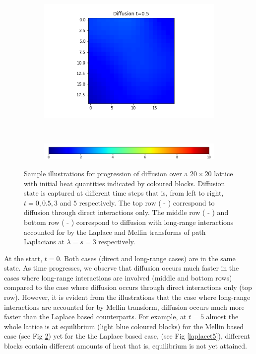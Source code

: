 \documentclass[10pt,a4paper]{article}
\theoremstyle{plain}
\theoremstyle{definition}
\begin{document}
\begin{figure}[!h]
\begin{subfigure}[b]{0.25\textwidth}
    		\caption{}
    		\label{mellint3}
    	\end{subfigure}~
    	\begin{subfigure}[b]{0.25\textwidth}
    		\includegraphics[width= \textwidth]{images/mellin-x3-t5.png}
    		\caption{}
    		\label{mellint5}
    	\end{subfigure} \\
        \begin{subfigure}[b]{0.45\textwidth}
        \includegraphics[width= \textwidth]{images/colour-bar-grid.png}
        \end{subfigure}
    		\caption{Sample illustrations for progression of diffusion over a $20 \times 20$ lattice with initial heat quantities indicated by coloured blocks. Diffusion state is captured at different time steps that is, from left to right, $t= 0, 0.5, 3$ and $5$ respectively. The top row ( - ) correspond to diffusion through direct interactions only. The middle row ( - ) and bottom row ( - ) correspond to diffusion with long-range interactions accounted for by the Laplace and Mellin transforms of path Laplacians at $\lambda = s=3$ respectively. }
    		\label{gridx0}
    	\end{figure}
    	
    	At the start, $t=0$. Both cases (direct and long-range cases) are in the same state. As time progresses, we observe that diffusion occurs much faster in the cases where long-range interactions are involved (middle and bottom rows) compared to the case where diffusion occurs through direct interactions only (top row). However, it is evident from the illustrations that the case where long-range interactions are accounted for by Mellin transform, diffusion occurs much more faster than the Laplace based counterparts. For example, at $t=5$ almost the whole lattice is at equilibrium (light blue coloured blocks) for the Mellin based case (see Fig \ref{mellint5}) yet for the the Laplace based case, (see Fig \ref{laplacet5}), different blocks contain different amounts of heat that is, equilibrium is not yet attained.
   	
\end{document}

